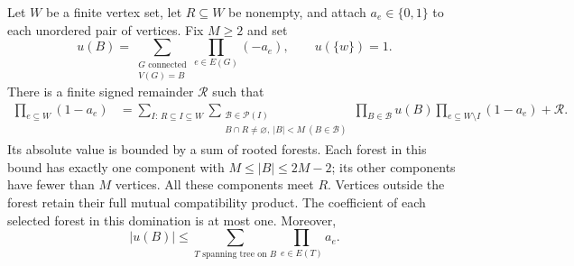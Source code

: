 \begin{lemma}\label{lem:rooted-forest}
Let $W$ be a finite vertex set, let $R\subseteq W$ be nonempty, and attach
$a_e\in\{0,1\}$ to each unordered pair of vertices.  Fix $M\ge2$ and set
\begin{equation}\label{eq:ursell-block}
 u(B)=\sum_{\substack{G\text{ connected}\\V(G)=B}}
             \prod_{e\in E(G)}(-a_e),\qquad u(\{w\})=1.
\end{equation}
There is a finite signed remainder $\mathcal R$ such that
\begin{align}\label{eq:finite-rooted-identity}
 \prod_{e\subseteq W}(1-a_e)
 &=\sum_{I:\,R\subseteq I\subseteq W}
   \sum_{\substack{\mathcal B\in\mathcal P(I)\\
               B\cap R\ne\varnothing,\ |B|<M\ (B\in\mathcal B)}}
       \prod_{B\in\mathcal B}u(B)
       \prod_{e\subseteq W\setminus I}(1-a_e)+\mathcal R.
\end{align}
Its absolute value is bounded by a sum of rooted forests.  Each forest in
this bound has exactly one component with $M\le |B|\le2M-2$; its other
components have fewer than $M$ vertices.  All these components meet $R$.
Vertices outside the forest retain their full mutual compatibility
product.  The coefficient of each selected forest in this domination is
at most one.  Moreover,
\begin{equation}\label{eq:ursell-tree-bound}
 |u(B)|\le\sum_{T\text{ spanning tree on }B}\prod_{e\in E(T)}a_e.
\end{equation}
\end{lemma}

